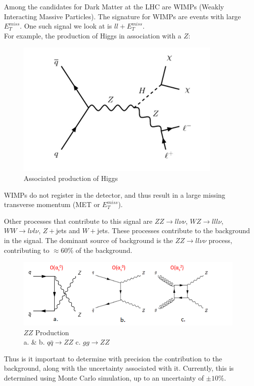 \documentclass[11pt,a4paper,final]{report}
\begin{document}
Among the candidates for Dark Matter at the LHC are WIMPs (Weakly Interacting Massive Particles). The signature for WIMPs are events with large $E_T^{miss}$. One such signal we look at is $ll+E_T^{miss}$. 
\\For example, the production of Higgs in association with a $Z$:
\begin{figure}[h]
	\begin{center}
		\includegraphics[scale=0.7]{HZ.png}
		\caption{Associated production of Higgs}
	\end{center}
\end{figure}
WIMPs do not register in the detector, and thus result in a large missing transverse momentum (MET or $E_T^{miss}$).

Other processes that contribute to this signal are $ZZ\rightarrow ll\nu\nu$, $WZ\rightarrow lll\nu$,$WW\rightarrow l\nu l\nu$, $Z+$jets and $W+$jets. These processes contribute to the background in the signal. The dominant source of background is the $ZZ \rightarrow ll\nu\nu$ process, contributing to $\approx 60 \%$ of the background. 
\begin{figure}[h]
	\begin{center}
		\includegraphics[scale=0.5]{ZZ.png}
		\caption{$ZZ$ Production \\ a. \& b. $q\bar{q}\rightarrow ZZ$ \hspace{2 cm} c. $gg\rightarrow ZZ$}
	\end{center}
\end{figure}
Thus is it important to determine with precision the contribution to the background, along with the uncertainty associated with it. Currently, this is determined using Monte Carlo simulation, up to an uncertainty of $\pm 10 \%$.
\end{document}
